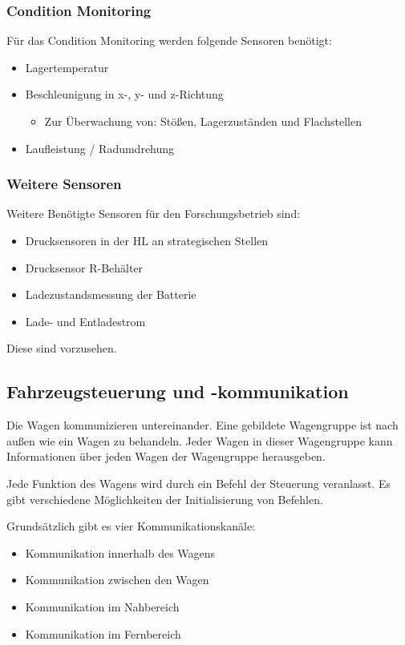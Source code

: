 \subsubsection{Condition Monitoring}
\begin{feat}
Für das Condition Monitoring werden folgende Sensoren benötigt:
\begin{itemize}
    \item Lagertemperatur
    \item Beschleunigung in x-, y- und z-Richtung
    \begin{itemize}
        \item Zur Überwachung von: Stößen, Lagerzuständen und Flachstellen
    \end{itemize}
    \item Laufleistung / Radumdrehung
\end{itemize}
\end{feat}

\subsubsection{Weitere Sensoren}
\begin{feat}
Weitere Benötigte Sensoren für den Forschungsbetrieb sind:
\begin{itemize}
    \item Drucksensoren in der \acrshort{HL} an strategischen Stellen
    \item Drucksensor R-Behälter
    \item Ladezustandsmessung der Batterie
    \item Lade- und Entladestrom
\end{itemize}
Diese sind vorzusehen.
\end{feat}

\subsection{Fahrzeugsteuerung und -kommunikation}
Die Wagen kommunizieren untereinander. Eine gebildete Wagengruppe ist nach außen wie ein Wagen zu behandeln. Jeder Wagen in dieser Wagengruppe kann Informationen über jeden Wagen der Wagengruppe herausgeben.\par
Jede Funktion des Wagens wird durch ein Befehl der Steuerung veranlasst. Es gibt verschiedene Möglichkeiten der Initialisierung von Befehlen.\par
Grundsätzlich gibt es vier Kommunikationskanäle:
\begin{itemize}
    \item Kommunikation innerhalb des Wagens
    \item Kommunikation zwischen den Wagen
    \item Kommunikation im Nahbereich
    \item Kommunikation im Fernbereich
\end{itemize}

